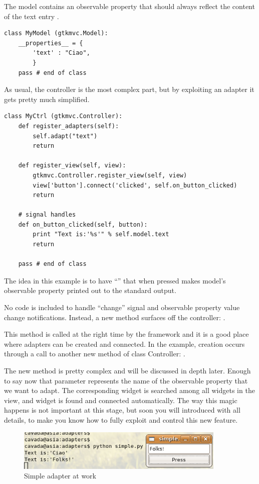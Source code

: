 The model contains an observable property that should always 
reflect the content of the text entry .

{ \codesize
\begin{verbatim}
class MyModel (gtkmvc.Model):
    __properties__ = {
        'text' : "Ciao",
        }
    pass # end of class
\end{verbatim}
}

As usual, the controller is the most complex part, but by exploiting
an adapter it gets pretty much simplified. 
{ \codesize
\begin{verbatim}
class MyCtrl (gtkmvc.Controller):
    def register_adapters(self):
        self.adapt("text")
        return

    def register_view(self, view):
        gtkmvc.Controller.register_view(self, view)
        view['button'].connect('clicked', self.on_button_clicked)
        return

    # signal handles
    def on_button_clicked(self, button):
        print "Text is:'%s'" % self.model.text
        return

    pass # end of class
\end{verbatim}
}

The idea in this example is to have ``''
that when pressed makes model's observable property 
printed out to the standard output.

No code is included to handle  ``change''
signal and observable property value change notifications. Instead,
a new method surfaces off the controller:
.

This method is called at the right time by the framework and it is a
good place where adapters can be created and connected. In the
example, creation occurs through a call to another new method of
class Controller: . 

The new method is pretty complex and will be discussed in depth
later. Enough to say now that parameter 
represents the name of the observable property that we want to
adapt. The corresponding widget is searched among all widgets in the
view, and widget  is found and connected
automatically. The way this magic happens is not important at this
stage, but soon you will introduced with all details, to make you
know how to fully exploit and control this new feature.

\begin{figure}[htbp]
\begin{center}
\includegraphics[width=10cm]{figs/png/adap1}
\caption{\label{ADAP1_f} Simple adapter at work}
\end{center}
\end{figure}


